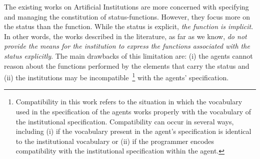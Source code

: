 \documentclass[runningheads]{llncs}
\begin{document}

The existing works on Artificial Institutions are more concerned with specifying and managing the constitution of status-functions. 
However, they focus more on the status than the function. While the status is explicit, \textit{the function is implicit}.
In other words, the works described in the literature, as far as we know, \emph{do not provide the means for the institution to express the functions associated with the status explicitly}.
The main drawbacks of this limitation are: (i) the agents cannot reason about the functions performed by the elements that carry the status and (ii) the institutions may be incompatible~\footnote{
Compatibility in this work refers to the situation in which the vocabulary used in the specification of the agents works properly with the vocabulary of the institutional specification. Compatibility can occur in several ways, including (i) if the vocabulary present in the agent's specification is identical to the institutional vocabulary or (ii) if the programmer encodes compatibility with the institutional specification within the agent.} with the agents' specification. 

\end{document}
